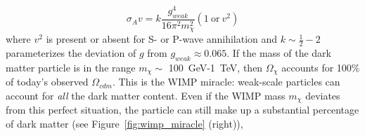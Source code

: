 \begin{equation}
\label{eq:sigmav}
\sigma_{A}v = k \frac{g_{weak}^{4}}{16 \pi^{2}m_{\chi}^{2}} ( \mathrm{1~or}~v^{2} ) 
\end{equation}
where $v^{2}$ is present or absent for S- or P-wave annihilation and $k \sim \frac{1}{2} - 2$ parameterizes the deviation of $g$ from $g_{weak} \approx 0.065$. If the mass of the dark matter particle is in the range $m_{\chi} \sim$ 100~GeV-1~TeV, then $\Omega_{\chi}$ accounts for 100\% of today's observed $\Omega_{cdm}$. This is the \ac{WIMP} miracle: weak-scale particles can account for \textit{all} the dark matter content. Even if the \ac{WIMP} mass $m_{\chi}$ deviates from this perfect situation, the particle can still make up a substantial percentage of dark matter (see Figure~\ref{fig:wimp_miracle} (right)),

